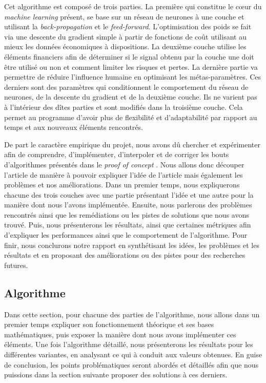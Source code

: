 \documentclass[a4paper, 11pt]{article}
\begin{document}
Cet algorithme est composé de trois parties. La première qui constitue le cœur du \textit{machine learning} présent, se base sur un réseau de neurones
à une couche et utilisant la \textit{back-propagation} et le \textit{feed-forward}. L'optimisation des poids se fait via une descente du gradient simple 
à partir de fonctions de coût utilisant au mieux les données économiques à dispositions. La deuxième couche utilise les éléments financiers afin de
déterminer si le signal obtenu par la couche une doit être utilisé ou non et comment limiter les risques et pertes. La dernière partie va permettre de
réduire l'influence humaine en optimisant les métas-paramètres. Ces derniers sont des paramètres qui conditionnent le comportement du réseau de neurones,
de la descente du gradient et de la deuxième couche. Ils ne varient pas 
à l'intérieur des dîtes parties et sont modifiés dans la troisième couche. Cela permet au programme d'avoir plus de flexibilité et d'adaptabilité par
rapport au temps et aux nouveaux éléments rencontrés.

De part le caractère empirique du projet, nous avons dû chercher et expérimenter afin de comprendre, d'implémenter, d'interpoler et de corriger
les bouts d'algorithmes présentés dans le \textit{proof of concept} \cite{fx_trading}. Nous allons donc découper l'article de manière à pouvoir 
expliquer l'idée de l'article mais également les problèmes et nos améliorations.
Dans un premier temps, nous expliquerons chacune des trois couches avec une partie présentant l'idée et une autre pour la manière dont nous l'avons
implémentée. Ensuite, nous parlerons des problèmes rencontrés ainsi que les remédiations ou les pistes de solutions que nous avons trouvé.
Puis, nous présenterons les résultats, ainsi que certaines métriques afin d'expliquer les performances ainsi que le comportement de l'algorithme. Pour
finir, nous conclurons notre rapport en synthétisant les idées, les problèmes et les résultats et en proposant des améliorations ou des pistes pour 
des recherches futures.

\subsection{Algorithme}
Dans cette section, pour chacune des parties de l'algorithme, nous allons dans un premier temps expliquer son fonctionnement théorique et ses bases
mathématiques, puis exposer la manière dont nous avons implémenter ces éléments.
Une fois l'algorithme détaillé, nous présenterons les résultats pour les différentes variantes, en analysant ce qui à conduit aux valeurs obtenues.
En guise de conclusion, les points problématiques seront abordés et détaillés afin que nous puissions dans la section suivante proposer des solutions à
ces derniers.
\end{document}
